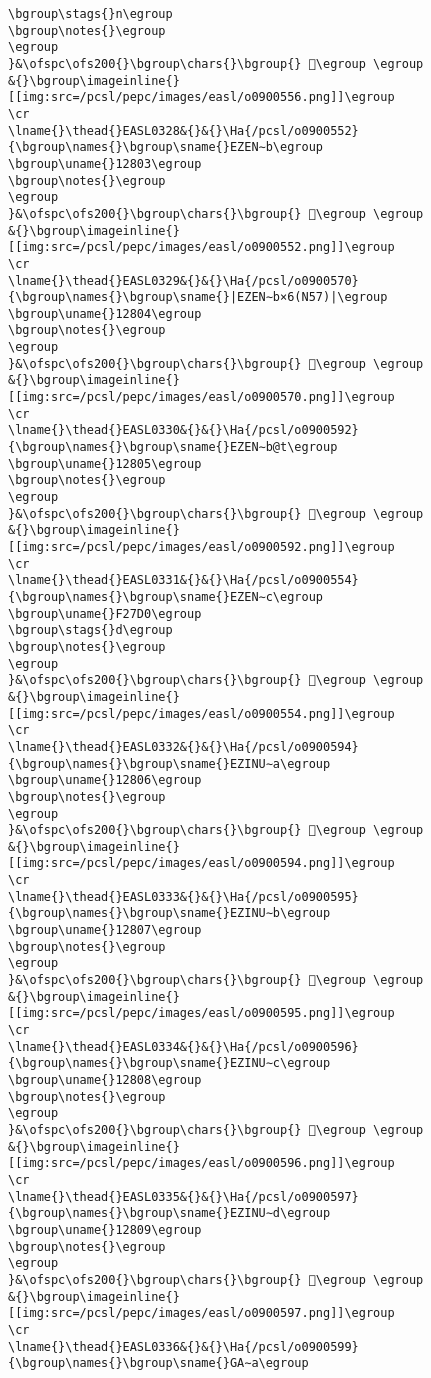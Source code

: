 \begin{verbatim}
\bgroup\stags{}n\egroup
\bgroup\notes{}\egroup
\egroup
}&\ofspc\ofs200{}\bgroup\chars{}\bgroup{} 𒠂\egroup \egroup
&{}\bgroup\imageinline{}[[img:src=/pcsl/pepc/images/easl/o0900556.png]]\egroup
\cr
\lname{}\thead{}EASL0328&{}&{}\Ha{/pcsl/o0900552}{\bgroup\names{}\bgroup\sname{}EZEN∼b\egroup
\bgroup\uname{}12803\egroup
\bgroup\notes{}\egroup
\egroup
}&\ofspc\ofs200{}\bgroup\chars{}\bgroup{} 𒠃\egroup \egroup
&{}\bgroup\imageinline{}[[img:src=/pcsl/pepc/images/easl/o0900552.png]]\egroup
\cr
\lname{}\thead{}EASL0329&{}&{}\Ha{/pcsl/o0900570}{\bgroup\names{}\bgroup\sname{}|EZEN∼b×6(N57)|\egroup
\bgroup\uname{}12804\egroup
\bgroup\notes{}\egroup
\egroup
}&\ofspc\ofs200{}\bgroup\chars{}\bgroup{} 𒠄\egroup \egroup
&{}\bgroup\imageinline{}[[img:src=/pcsl/pepc/images/easl/o0900570.png]]\egroup
\cr
\lname{}\thead{}EASL0330&{}&{}\Ha{/pcsl/o0900592}{\bgroup\names{}\bgroup\sname{}EZEN∼b@t\egroup
\bgroup\uname{}12805\egroup
\bgroup\notes{}\egroup
\egroup
}&\ofspc\ofs200{}\bgroup\chars{}\bgroup{} 𒠅\egroup \egroup
&{}\bgroup\imageinline{}[[img:src=/pcsl/pepc/images/easl/o0900592.png]]\egroup
\cr
\lname{}\thead{}EASL0331&{}&{}\Ha{/pcsl/o0900554}{\bgroup\names{}\bgroup\sname{}EZEN∼c\egroup
\bgroup\uname{}F27D0\egroup
\bgroup\stags{}d\egroup
\bgroup\notes{}\egroup
\egroup
}&\ofspc\ofs200{}\bgroup\chars{}\bgroup{} 󲟐\egroup \egroup
&{}\bgroup\imageinline{}[[img:src=/pcsl/pepc/images/easl/o0900554.png]]\egroup
\cr
\lname{}\thead{}EASL0332&{}&{}\Ha{/pcsl/o0900594}{\bgroup\names{}\bgroup\sname{}EZINU∼a\egroup
\bgroup\uname{}12806\egroup
\bgroup\notes{}\egroup
\egroup
}&\ofspc\ofs200{}\bgroup\chars{}\bgroup{} 𒠆\egroup \egroup
&{}\bgroup\imageinline{}[[img:src=/pcsl/pepc/images/easl/o0900594.png]]\egroup
\cr
\lname{}\thead{}EASL0333&{}&{}\Ha{/pcsl/o0900595}{\bgroup\names{}\bgroup\sname{}EZINU∼b\egroup
\bgroup\uname{}12807\egroup
\bgroup\notes{}\egroup
\egroup
}&\ofspc\ofs200{}\bgroup\chars{}\bgroup{} 𒠇\egroup \egroup
&{}\bgroup\imageinline{}[[img:src=/pcsl/pepc/images/easl/o0900595.png]]\egroup
\cr
\lname{}\thead{}EASL0334&{}&{}\Ha{/pcsl/o0900596}{\bgroup\names{}\bgroup\sname{}EZINU∼c\egroup
\bgroup\uname{}12808\egroup
\bgroup\notes{}\egroup
\egroup
}&\ofspc\ofs200{}\bgroup\chars{}\bgroup{} 𒠈\egroup \egroup
&{}\bgroup\imageinline{}[[img:src=/pcsl/pepc/images/easl/o0900596.png]]\egroup
\cr
\lname{}\thead{}EASL0335&{}&{}\Ha{/pcsl/o0900597}{\bgroup\names{}\bgroup\sname{}EZINU∼d\egroup
\bgroup\uname{}12809\egroup
\bgroup\notes{}\egroup
\egroup
}&\ofspc\ofs200{}\bgroup\chars{}\bgroup{} 𒠉\egroup \egroup
&{}\bgroup\imageinline{}[[img:src=/pcsl/pepc/images/easl/o0900597.png]]\egroup
\cr
\lname{}\thead{}EASL0336&{}&{}\Ha{/pcsl/o0900599}{\bgroup\names{}\bgroup\sname{}GA∼a\egroup

\end{verbatim}
